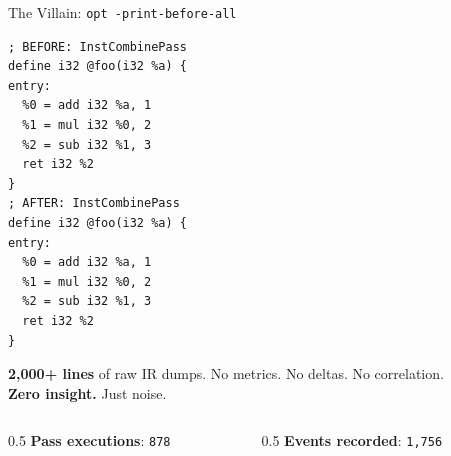 \documentclass[aspectratio=169]{beamer}
\newcommand{\metric}[2]{\textbf{#1}: \texttt{#2}}
\begin{document}
\begin{frame}[fragile]{The Villain: \texttt{opt -print-before-all}}
  \footnotesize
  \begin{lstlisting}[style=llvm]
; BEFORE: InstCombinePass
define i32 @foo(i32 %a) {
entry:
  %0 = add i32 %a, 1
  %1 = mul i32 %0, 2
  %2 = sub i32 %1, 3
  ret i32 %2
}
; AFTER: InstCombinePass
define i32 @foo(i32 %a) {
entry:
  %0 = add i32 %a, 1
  %1 = mul i32 %0, 2
  %2 = sub i32 %1, 3
  ret i32 %2
}
  \end{lstlisting}
  \vspace{-0.5em}
  \begin{alertblock}{}
    \textbf{2,000+ lines} of raw IR dumps. No metrics. No deltas. No correlation.\\
    \textbf{Zero insight.} Just noise.
  \end{alertblock}
  \vspace{-0.5em}
  \begin{columns}[T,onlytextwidth]
    \begin{column}{0.5\textwidth}
      \metric{Pass executions}{878}
    \end{column}
    \begin{column}{0.5\textwidth}
      \metric{Events recorded}{1,756}
    \end{column}
  \end{columns}
\end{frame}
\end{document}
